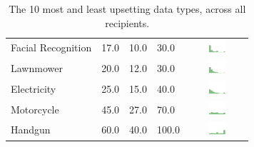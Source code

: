 \begin{table}[t]
\begin{center}
\begin{tabular}{| p{2cm} | p{1cm} | p{1cm} | p{1cm} | c |}
Facial Recognition & 17.0 & 10.0 & 30.0 & \includegraphics[width = 2cm, height = 0.5cm]{tables/facialrecognitionrisk} \\ 
Lawnmower & 20.0 & 12.0 & 30.0 & \includegraphics[width = 2cm, height = 0.5cm]{tables/LawnmowerRisk} \\ 
Electricity & 25.0 & 15.0 & 40.0 & \includegraphics[width = 2cm, height = 0.5cm]{tables/ElectricityRisk} \\ 
Motorcycle & 45.0 & 27.0 & 70.0 & \includegraphics[width = 2cm, height = 0.5cm]{tables/MotorcycleRisk} \\ 
Handgun & 60.0 & 40.0 & 100.0 & \includegraphics[width = 2cm, height = 0.5cm]{tables/HandgunRisk} \\ 
\hline
\end{tabular}
\caption{The 10 most and least upsetting data types, across all recipients.}
\label{top10}
\end{center}
\end{table}
